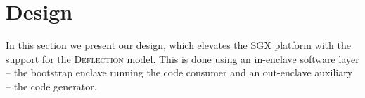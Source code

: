 \section{Design}\label{sec-design}




In this section we present our design, which elevates the SGX platform with the support for the \textsc{Deflection} model. This is done using an in-enclave software layer -- the bootstrap enclave running the code consumer and an out-enclave auxiliary -- the code generator. 
\DIFdelbegin {}\DIFdelend %




